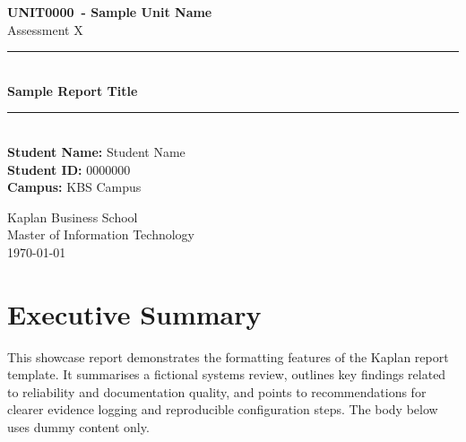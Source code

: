 \documentclass[12pt, a4paper]{article}
\newcommand{\unitcode}{UNIT0000}
\newcommand{\unitname}{Sample Unit Name}
\newcommand{\assessmentname}{Assessment X}
\newcommand{\reporttitle}{Sample Report Title}
\newcommand{\studentname}{Student Name}
\newcommand{\studentid}{0000000}
\newcommand{\campusname}{KBS Campus}
\begin{document}
\begin{titlepage}
  \centering
  \vspace*{2cm}

  {\LARGE\bfseries \unitcode\ - \unitname\\[6pt]}
  {\Large \assessmentname\\[24pt]}

  \rule{\textwidth}{1pt}\\[18pt]

  {\huge\bfseries \reporttitle\\[18pt]}

  \rule{\textwidth}{1pt}\\[36pt]

  {\Large
    \textbf{Student Name:} \studentname\\[6pt]
    \textbf{Student ID:}   \studentid\\[6pt]
    \textbf{Campus:}       \campusname\\[6pt]
  }

  \vfill
  {\large Kaplan Business School\\[6pt]}
  {\large Master of Information Technology\\[6pt]}
  {\large \today}
\end{titlepage}

\setcounter{page}{2}                    %

\newpage
\tableofcontents
\newpage

\section*{Executive Summary}
\label{sec:executive-summary}

This showcase report demonstrates the formatting features of the Kaplan
report template. It summarises a fictional systems review, outlines key
findings related to reliability and documentation quality, and points to
recommendations for clearer evidence logging and reproducible configuration
steps. The body below uses dummy content only.
\end{document}
